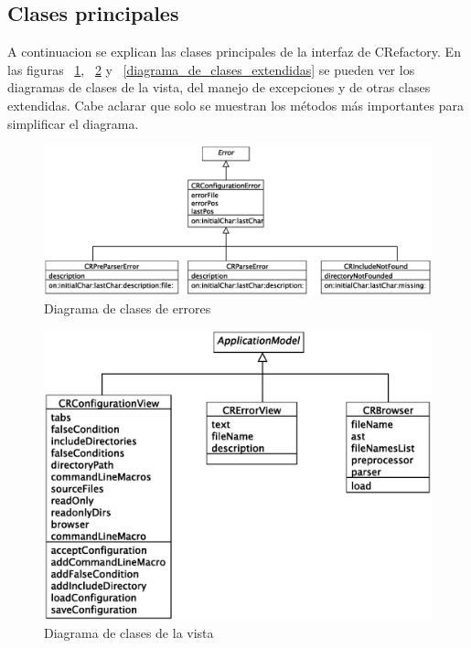 \documentclass[a4paper,oneside,12pt]{article}
\begin{document}
\subsection{Clases principales}

A continuacion se explican las clases principales de la interfaz de CRefactory. En las figuras ~\ref{diagrama_de_clases_excepciones}, ~\ref{diagrama_de_clases_vista} y ~\ref{diagrama_de_clases_extendidas} se pueden ver los diagramas de clases de la vista, del manejo de excepciones y de otras clases extendidas. Cabe aclarar que solo se muestran los m\'etodos m\'as importantes para simplificar el diagrama.

\begin{figure}[h!]
  \centering
    \includegraphics[scale=0.50]{images/diagrama_clases_excepciones.eps}
    \caption{Diagrama de clases de errores}
    \label{diagrama_de_clases_excepciones}
\end{figure}

\begin{figure}[h!]
  \centering
    \includegraphics[scale=0.60]{images/diagrama_clases_vista.eps}
    \caption{Diagrama de clases de la vista}
    \label{diagrama_de_clases_vista}
\end{figure}
\end{document}

